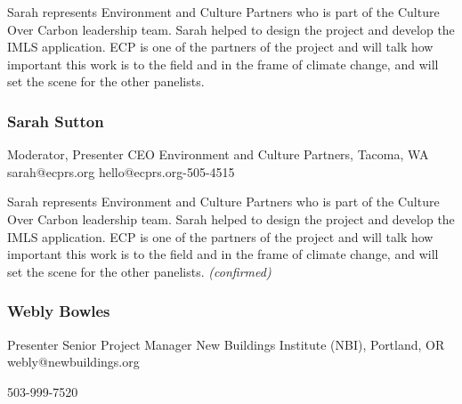 \documentclass{report}
\begin{document}
              Sarah represents Environment and Culture Partners who is part of the Culture Over Carbon leadership team. Sarah helped to design the project and develop the IMLS application. ECP is one of the partners of the project and will talk how important this work is to the field and in the frame of climate change, and will set the scene for the other panelists.\newline


              
                \subsubsection*{ Sarah Sutton }
                Moderator, Presenter\newline
                CEO\newline
                Environment and Culture Partners, Tacoma, WA
                \newline
                sarah@ecprs.org\newline
                hello@ecprs.org-505-4515\newline

                Sarah represents Environment and Culture Partners who is part of the Culture Over Carbon leadership team. Sarah helped to design the project and develop the IMLS application. ECP is one of the partners of the project and will talk how important this work is to the field and in the frame of climate change, and will set the scene for the other panelists.\newline
                \emph{ (confirmed) }
              

              
                \subsubsection*{ Webly Bowles }
                Presenter\newline
                Senior Project Manager\newline
                New Buildings Institute (NBI), Portland, OR
                \newline
                webly@newbuildings.org\newline
                
                503-999-7520\newline
\end{document}
